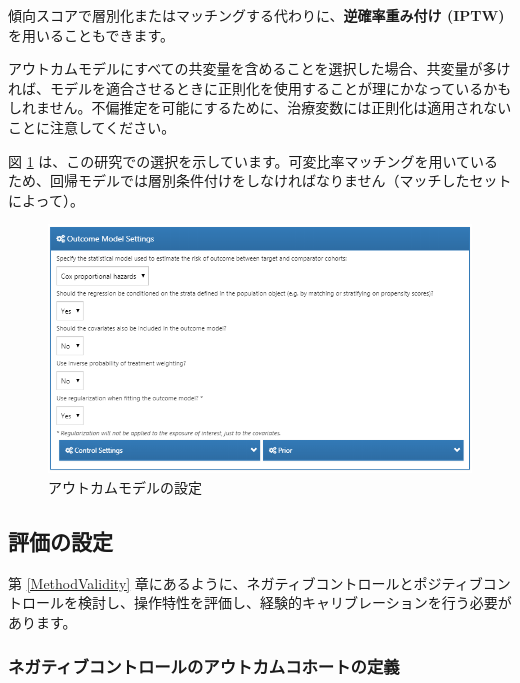 \documentclass[
  11pt]{book}
\theoremstyle{definition}
\theoremstyle{definition}
\theoremstyle{definition}
\theoremstyle{definition}
\theoremstyle{remark}
\begin{document}
傾向スコアで層別化またはマッチングする代わりに、\textbf{逆確率重み付け (IPTW)}を用いることもできます。

アウトカムモデルにすべての共変量を含めることを選択した場合、共変量が多ければ、モデルを適合させるときに正則化を使用することが理にかなっているかもしれません。不偏推定を可能にするために、治療変数には正則化は適用されないことに注意してください。

図 \ref{fig:outcomeModelSettings} は、この研究での選択を示しています。可変比率マッチングを用いているため、回帰モデルでは層別条件付けをしなければなりません（マッチしたセットによって）。

\begin{figure}

{\centering \includegraphics[width=1\linewidth]{images/PopulationLevelEstimation/outcomeModelSettings} 

}

\caption{アウトカムモデルの設定}\label{fig:outcomeModelSettings}
\end{figure}

\subsection{評価の設定}\label{evaluationSettings}

第 \ref{MethodValidity} 章にあるように、ネガティブコントロールとポジティブコントロールを検討し、操作特性を評価し、経験的キャリブレーションを行う必要があります。

\subsubsection*{ネガティブコントロールのアウトカムコホートの定義}\label{ux30cdux30acux30c6ux30a3ux30d6ux30b3ux30f3ux30c8ux30edux30fcux30ebux306eux30a2ux30a6ux30c8ux30abux30e0ux30b3ux30dbux30fcux30c8ux306eux5b9aux7fa9}
\end{document}

